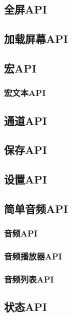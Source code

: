 \documentclass[hyperref,UTF8]{ctexart}
\begin{document}
\newpage
\subsection{全屏API}

\newpage
\subsection{加载屏幕API}

\newpage
\subsection{宏API}

\subsubsection{宏文本API}

\newpage
\subsection{通道API}

\newpage
\subsection{保存API}

\newpage
\subsection{设置API}

\newpage
\subsection{简单音频API}

\subsubsection{音频API}

\subsubsection{音频播放器API}

\subsubsection{音频列表API}

\newpage
\subsection{状态API}
\end{document}
